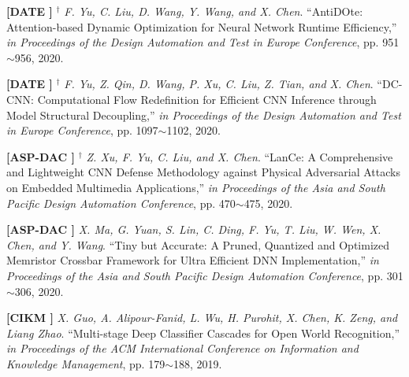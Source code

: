 	\textbf{[DATE ]}
	$^\dagger$
	\textsl{F. Yu, C. Liu, D. Wang, Y. Wang, and X. Chen}.
		``AntiDOte: Attention-based Dynamic Optimization for Neural Network Runtime Efficiency,''
		\textsl{in Proceedings of the Design Automation and Test in Europe Conference},  pp. 951$\sim$956, 2020.
			\vspace{-3mm}

	\textbf{[DATE ]}
	$^\dagger$
	\textsl{F. Yu, Z. Qin, D. Wang, P. Xu, C. Liu, Z. Tian, and X. Chen}.
		``DC-CNN\@: Computational Flow Redefinition for Efficient CNN Inference through Model Structural Decoupling,''
		\textsl{in Proceedings of the Design Automation and Test in Europe Conference}, pp. 1097$\sim$1102, 2020.
			\vspace{-3mm}

	\textbf{[ASP-DAC ]}
	$^\dagger$
	\textsl{Z. Xu, F. Yu, C. Liu, and X. Chen}.
		``LanCe\@: A Comprehensive and Lightweight CNN Defense Methodology against Physical Adversarial Attacks on Embedded Multimedia Applications,''
		\textsl{in Proceedings of the Asia and South Pacific Design Automation Conference}, pp. 470$\sim$475, 2020.
			\vspace{-3mm}

	\textbf{[ASP-DAC ]}\hspace{2mm}
	\textsl{X. Ma, G. Yuan, S. Lin, C. Ding, F. Yu, T. Liu, W. Wen, X. Chen, and Y. Wang}.
		``Tiny but Accurate: A Pruned, Quantized and Optimized Memristor Crossbar Framework for Ultra Efficient DNN Implementation,''
		\textsl{in Proceedings of the Asia and South Pacific Design Automation Conference}, pp. 301$\sim$306, 2020.
			\vspace{-3mm}

	\textbf{[CIKM ]}\hspace{2mm}
	\textsl{X. Guo, A. Alipour-Fanid, L. Wu, H. Purohit, X. Chen, K. Zeng, and Liang Zhao}.
		``Multi-stage Deep Classifier Cascades for Open World Recognition,''
		\textsl{in Proceedings of the ACM International Conference on Information and Knowledge Management}, pp. 179$\sim$188, 2019.
			\vspace{-3mm}

